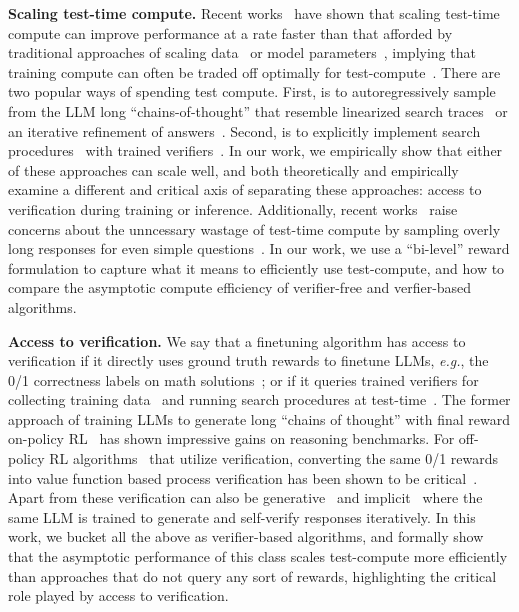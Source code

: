 \textbf{Scaling test-time compute.} Recent works~\cite{sardana2023beyond,snell2024scaling} have shown that scaling test-time compute can improve performance at a rate faster than that afforded by traditional approaches of scaling data~\cite{li2024common} or model parameters~\cite{hoffmann2022training}, implying that training compute can often be traded off optimally for test-compute~\cite{villalobos2023trading,jones2021scaling}. There are two popular ways of spending test compute. First, is to autoregressively sample from the LLM long ``chains-of-thought''  that resemble linearized search traces~\cite{yao2023tree,gandhi2024stream} or an iterative refinement of answers~\cite{qu2024recursive,kumar2024training}. Second, is to explicitly implement search procedures~\cite{wu2024inference,beeching2024scalingtesttimecompute} with trained verifiers~\cite{cobbe2021gsm8k,setlur2024rewarding}. In our work, we empirically show that either of these approaches can scale well, and both theoretically and empirically examine a different and critical axis of separating these approaches: access to verification during training or inference. Additionally,  recent works~\cite{chen2024not,setlur2025opt} raise concerns about the unncessary wastage of test-time compute by sampling overly long responses for even simple questions~\cite{qwen2}. In our work, we use a ``bi-level'' reward formulation to capture what it means to efficiently use test-compute, and how to compare the asymptotic compute efficiency of verifier-free and verfier-based algorithms. 

\textbf{Access to verification.} We say that a finetuning algorithm has access to verification if it directly uses ground truth rewards to finetune LLMs, \textit{e.g.}, the 0/1 correctness labels on math solutions~\cite{uesato2022solving,bi2024deepseek}; or if it queries trained verifiers for collecting training data~\cite{hosseini2024v} and running search procedures at test-time~\cite{welleck2024decoding,chen2024more,chow2024inference}. The former approach of training LLMs to generate long ``chains of thought'' with final reward on-policy RL~\cite{MoonshotAI,deepseekai2025deepseekr1incentivizingreasoningcapability} has shown impressive gains on reasoning benchmarks. For off-policy RL algorithms~\cite{rafailov2023direct,zelikman2022star,singh2023beyond} that utilize verification, converting the same 0/1 rewards into value function based process verification has been shown to be critical~\cite{setlur2024rl}. 
Apart from these verification can also be generative~\cite{zhang2024generative} and implicit~\cite{yuan2024implicitprm} where the same LLM is trained to generate and self-verify responses iteratively.  In this work, we bucket all the above as verifier-based algorithms, and formally show that  the asymptotic performance of this class scales test-compute more efficiently than approaches that do not query any sort of rewards, highlighting the critical role played by access to verification. 




